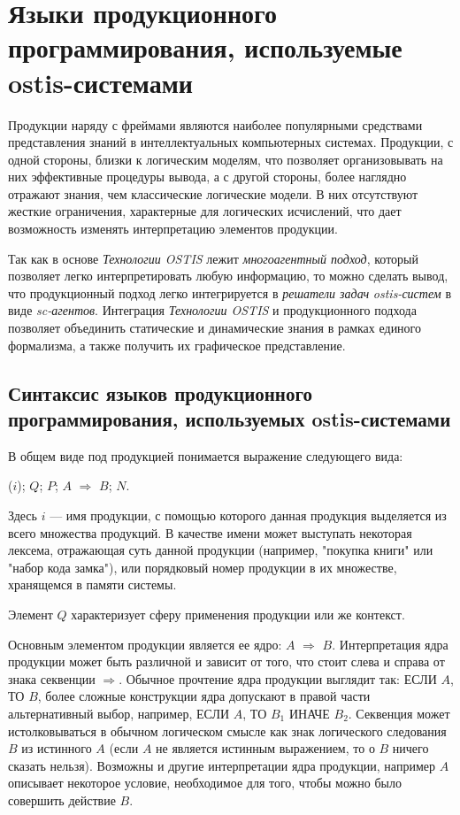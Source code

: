 \section{Языки продукционного программирования, используемые ostis-системами}
\label{sec_logic_productions}

Продукции наряду с фреймами являются наиболее популярными средствами представления знаний в интеллектуальных компьютерных системах. Продукции, с одной стороны, близки к  логическим моделям, что позволяет организовывать на них эффективные процедуры вывода, а с другой стороны, более наглядно отражают знания, чем классические логические модели. В них отсутствуют жесткие ограничения, характерные для логических исчислений, что дает возможность изменять  
интерпретацию элементов продукции.

Так как в основе \textit{Технологии OSTIS} лежит \textit{многоагентный подход}, который позволяет легко интерпретировать любую информацию, то можно сделать вывод, что продукционный подход легко интегрируется в \textit{решатели задач} \textit{ostis-систем} в виде \textit{sc-агентов}.  Интеграция \textit{Технологии OSTIS} и продукционного подхода позволяет объединить статические и динамические знания в рамках единого формализма, а также получить их графическое представление.

\subsection{Синтаксис языков продукционного программирования, используемых ostis-системами}

В общем виде под продукцией понимается выражение следующего вида:

($i$); $Q$; $P$; $A$ $\Rightarrow$ $B$; $N$.

Здесь $i$ --- имя продукции, с помощью которого данная продукция выделяется из всего множества продукций. В качестве имени может выступать некоторая лексема, отражающая суть данной продукции (например, "покупка книги"{} или "набор кода замка"{}), или порядковый номер продукции в их множестве, хранящемся в памяти системы. 

Элемент $Q$ характеризует сферу применения продукции или же контекст. 

Основным элементом продукции является ее ядро: $A$ $\Rightarrow$ $B$. Интерпретация ядра продукции может быть различной и зависит от того, что стоит слева и справа от знака секвенции $\Rightarrow$. Обычное прочтение ядра продукции выглядит так: ЕСЛИ $A$, ТО $B$, более сложные конструкции ядра допускают в правой части альтернативный выбор, например, ЕСЛИ $A$, ТО $B_1$ ИНАЧЕ $B_2$. Секвенция может истолковываться в обычном логическом смысле как знак логического следования $B$ из истинного $A$ (если $A$ не является истинным выражением, то о $B$ ничего сказать нельзя). Возможны и другие интерпретации ядра продукции, например $A$ описывает некоторое условие, необходимое для того, чтобы можно было совершить действие $B$.

